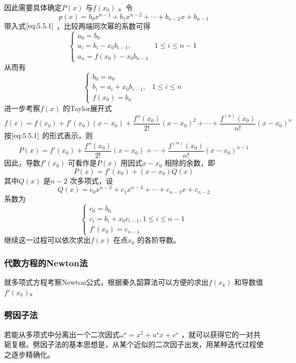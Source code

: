 \documentclass[a4paper]{article}
\begin{document}
因此需要具体确定$P(x)$ 与$f(x_0)$ 。令
\[
	p(x) = b_0 x^{n-1} + b_1 x^{n-2} + \cdots + b_{n-2} x + b_{n-1}
\] 
带入式$\ref{eq:5.5.1}$ ，比较两端同次幂的系数可得
\[
\begin{cases}
	a_0 = b_0 \\
	a_i = b_i - x_0 b_{i-1}, & 1 \le i \le n-1 \\
	a_n = f(x_0) - x_0 b_{n-1}
\end{cases} 
\] 
从而有
\[
\begin{cases}
	b_0 = a_0 \\
	b_i = a_i + x_0 b_{i-1}, & 1 \le i \le n \\
	f(x_0) = b_n
\end{cases} 
\] 
进一步考察$f(x)$ 的Taylor展开式
\[
f(x) = f(x_0) + f'(x_0) (x - x_0) + \frac{f''(x_0)}{2!} (x - x_0)^2 + \cdots + \frac{f^{(n)}(x_0)}{n!} (x-x_0)^{n}
\] 
按$\ref{eq:5.5.1}$ 的形式表示，则
\[
P(x) = f'(x_0) + \frac{f''(x_0)}{2!} (x - x_0) + \cdots + \frac{f^{(n)}(x_0)}{n!} (x-x_0)^{n-1}
\] 
因此，导数$f'(x_0)$ 可看作是$P(x)$ 用因式$x-x_0$ 相除的余数，即
\[
P(x) = f'(x_0) + (x - x_0) Q(x)
\] 
其中$Q(x)$ 是$n-2$ 次多项式，设
\[
	Q(x) = c_0 x^{n-2} + c_1 x^{n-3} + \cdots + c_{n-3} x + c_{n-2}
\] 
系数为
\[
\begin{cases}
	c_0 = b_0 \\
	c_i = b_i + x_0 c_{i-1}, 1 \le i \le n-1 \\
	f'(x_0) = c_{n-1}
\end{cases} 
\] 
继续这一过程可以依次求出$f(x)$ 在点$x_0$ 的各阶导数。

\subsubsection{代数方程的Newton法}
就多项式方程考察Newton公式，根据秦久韶算法可以方便的求出$f(x_{k})$ 和导数值$f'(x_{k})$。

\subsubsection{劈因子法}
若能从多项式中分离出一个二次因式$\omega^{\star} = x^2 + u^{\star} x + v^{\star}$ ，就可以获得它的一对共轭复根。劈因子法的基本思想是，从某个近似的二次因子出发，用某种迭代过程使之逐步精确化。
\end{document}

